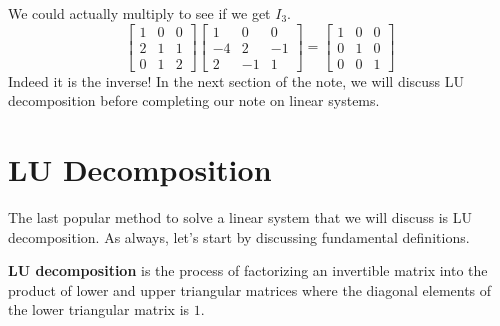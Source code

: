 \documentclass[../main.tex]{subfiles}
\begin{document}
We could actually multiply to see if we get $I_3$.
\[
\begin{bmatrix}
    1 & 0 & 0 \\
    2 & 1 & 1 \\
    0 & 1 & 2
\end{bmatrix}
\begin{bmatrix}
    1  & 0  & 0 \\
    -4 & 2  & -1 \\
    2  & -1 & 1
\end{bmatrix}
=
\begin{bmatrix}
    1 & 0 & 0 \\
    0 & 1 & 0 \\
    0 & 0 & 1
\end{bmatrix}
\]
Indeed it is the inverse! In the next section of the note,
we will discuss LU decomposition before completing our note on
linear systems.

\section{LU Decomposition}

The last popular method to solve a linear system that we will
discuss is LU decomposition. As always, let's start by discussing
fundamental definitions.

\begin{definition}
\textbf{LU decomposition} is the process of factorizing an
invertible matrix into the product of lower and upper triangular
matrices where the diagonal elements of the lower triangular matrix
is $1$.
\end{definition}
\end{document}
